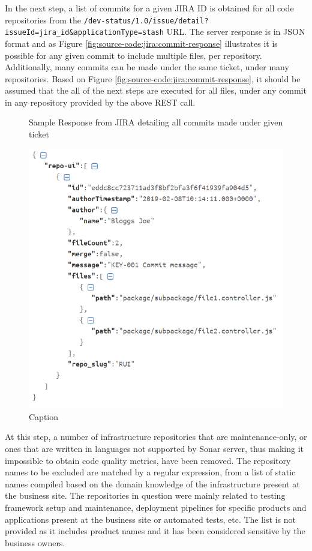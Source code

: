 In the next step, a list of commits for a given JIRA ID is obtained for all code repositories from the \texttt{/dev-status/1.0/issue/detail?issueId={jira_id}&applicationType=stash} URL. The server response is in JSON format and as Figure \ref{fig:source-code:jira:commit-response} illustrates it is possible for any given commit to include multiple files, per repository. Additionally, many commits can be made under the same ticket, under many repositories. Based on Figure \ref{fig:source-code:jira:commit-response}, it should be assumed that the all of the next steps are executed for all files, under any commit in any repository provided by the above REST call.
\begin{figure}[!h]
    \centering
    \caption{Sample Response from JIRA detailing all commits made under given ticket}
    \label{fig:source-code:jira:commit-response}
    \includegraphics[scale=0.7]{Figures/gatherer/jira_connector_getting_commit_files_response.PNG}
    \caption{Caption}
    \label{fig:my_label}
\end{figure}
    
At this step, a number of infrastructure repositories that are maintenance-only, or ones that are written in languages not supported by Sonar server, thus making it impossible to obtain code quality metrics, have been removed. The repository names to be excluded are matched by a regular expression, from a list of static names compiled based on the domain knowledge of the infrastructure present at the business site. The repositories in question were mainly related to testing framework setup and maintenance, deployment pipelines for specific products and applications present at the business site or automated tests, etc. The list is not provided as it includes product names and it has been considered sensitive by the business owners.
    
